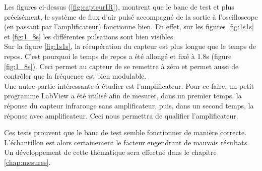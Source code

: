 Les figures ci-dessus (\ref{fig:capteurIR}), montrent que le banc de test et plus précisément, le système de flux d'air pulsé accompagné de
la sortie à l'oscilloscope (en passant par l'amplificateur) fonctionne bien. En effet, sur les figures \ref*{fig:1s1s} et \ref*{fig:1_8s}
les différentes pulsations sont bien visibles.\\

Sur la figure \ref*{fig:1s1s}, la récupération du capteur est plus longue que le temps de repos. C'est pourquoi le temps de repos a été allongé
et fixé à 1.8s (figure \ref*{fig:1_8s}). Ceci permet au capteur de se remettre à zéro et permet aussi de contrôler que la fréquence est bien
modulable. \\

Une autre partie intéressante à étudier est l'amplificateur. Pour ce faire, un petit programme LabView a été utilisé afin de mesurer, dans un
premier temps, la réponse du capteur \gls{infrarouge} sans amplificateur, puis, dans un second temps, la réponse avec amplificateur. Ceci nous
permettra de qualifier l'amplificateur.

Ces tests prouvent que le banc de test semble fonctionner de manière correcte. L'échantillon est alors certainement le facteur engendrant de
mauvais résultats. Un développement de cette thématique sera effectué dans le chapitre \ref{chap:mesures}.

\newpage
